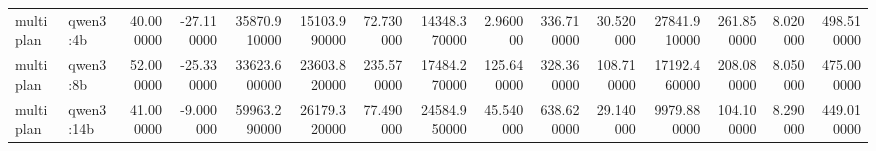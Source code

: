 \begin{table}
\begin{tabular}{llrrrrrrrrrrrrr}
multiplan & qwen3:4b & 40.000000 & -27.110000 & 35870.910000 & 15103.990000 & 72.730000 & 14348.370000 & 2.960000 & 336.710000 & 30.520000 & 27841.910000 & 261.850000 & 8.020000 & 498.510000 \\
multiplan & qwen3:8b & 52.000000 & -25.330000 & 33623.600000 & 23603.820000 & 235.570000 & 17484.270000 & 125.640000 & 328.360000 & 108.710000 & 17192.460000 & 208.080000 & 8.050000 & 475.000000 \\
multiplan & qwen3:14b & 41.000000 & -9.000000 & 59963.290000 & 26179.320000 & 77.490000 & 24584.950000 & 45.540000 & 638.620000 & 29.140000 & 9979.880000 & 104.100000 & 8.290000 & 449.010000 \\
\bottomrule
\end{tabular}
\end{table}
